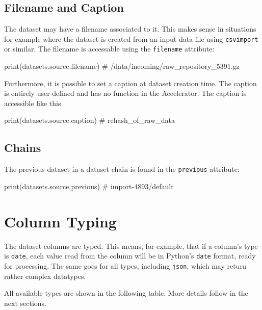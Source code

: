 \subsection*{Filename and Caption}
The dataset may have a filename associated to it.  This makes sense in
situations for example where the dataset is created from an input data
file using \texttt{csvimport} or similar.  The filename is accessable
using the \texttt{filename} attribute:
\begin{python}
print(datasets.source.filename)
# /data/incoming/raw_repository_5391.gz
\end{python}
Furthermore, it is possible to set a caption at dataset creation time.
The caption is entirely user-defined and has no function in the
Accelerator.  The caption is accessible like this
\begin{python}
print(datasets.source.caption)
# rehash_of_raw_data
\end{python}



\subsection*{Chains}
The previous dataset in a dataset chain is found in the
\texttt{previous} attribute:
\begin{python}
print(datasets.source.previous)
# import-4893/default
\end{python}



\newpage
\section{Column Typing}
The dataset columns are typed.  This means, for example, that if a
column's type is \texttt{date}, each value read from the column will
be in Python's \texttt{date} format, ready for processing.  The same
goes for all types, including \texttt{json}, which may return rather
complex datatypes.

All available types are shown in the following table.  More details
follow in the next sections.



